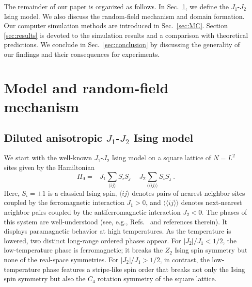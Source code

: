 \documentclass[twocolumn,showpacs,superscriptaddress,aps,prb]{revtex4-2}
\begin{document}
The remainder of our paper is organized as follows. In Sec.\ \ref{sec:model+theory}, we define the
$J_1$-$J_2$ Ising model. We also discuss the random-field mechanism and domain formation.
Our computer simulation methods are introduced in Sec.\ \ref{sec:MC}. Section \ref{sec:results}
is devoted to the simulation results and a comparison with theoretical predictions. We conclude in
Sec.\ \ref{sec:conclusion} by discussing the generality of our findings and their consequences for
experiments.



\section{Model and random-field mechanism}
\label{sec:model+theory}
\subsection{Diluted anisotropic $J_1$-$J_2$ Ising model}
\label{subsec:model}

We start with the well-known $J_1$-$J_2$ Ising model on a square lattice of $N=L^2$ sites given
by the Hamiltonian
\begin{equation}
H_0 = - J_1 \sum_{\langle ij \rangle} S_i S_j  - J_2 \sum_{\langle\langle ij \rangle\rangle}  S_i S_j ~.
\label{eq:H0}
\end{equation}
Here, $S_i = \pm 1$ is a classical Ising spin, $\langle ij \rangle$ denotes pairs of nearest-neighbor
sites coupled by the ferromagnetic interaction $J_1>0$, and $\langle\langle ij \rangle\rangle$
denotes next-nearest neighbor pairs coupled by the antiferromagnetic interaction $J_2 < 0$.
The phases of this system are well-understood (see, e.g., Refs.\
\cite{JinSenSandvik12,JinSenGuoSandvik13,KalzHoneckerMoliner11,KalzHonecker12} and references therein).
It displays paramagnetic behavior at high temperatures.  As the temperature is lowered, two distinct
long-range ordered phases appear.
For $|J_2|/J_1 < 1/2$, the low-temperature phase is ferromagnetic; it breaks the $Z_2$ Ising
spin symmetry but none of the real-space symmetries.
For $|J_2|/J_1>1/2$, in contrast, the low-temperature phase features a stripe-like spin order
that breaks not only the Ising spin symmetry but also the $C_4$ rotation symmetry of the square lattice.
\end{document}
